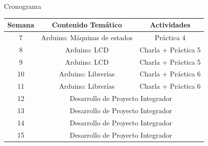 \documentclass[handout,xcolor=dvipsnames]{beamer}
\begin{document}
\begin{frame}{Cronograma}
 \begin{center}
 {\small
  \begin{tabular}{|c|c|c|}\hline

   Semana 	& \multicolumn{1}{c|}{Contenido Temático} & \multicolumn{1}{c|}{Actividades} \\ \hline \hline
   7 		& Arduino: Máquinas de estados	 & Práctica 4 \\ \hline
   8 		& Arduino: LCD  	             & Charla + Práctica 5 \\ \hline
   9 		& Arduino: LCD      		     & Charla + Práctica 5 \\ \hline
   10 		& Arduino: Librerías		& Charla + Práctica 6  \\ \hline
   11		& Arduino: Librerías	& Charla + Práctica 6  \\ \hline
   12 		& \multicolumn{2}{c|}{Desarrollo de Proyecto Integrador}  \\ \hline
   13 		& \multicolumn{2}{c|}{Desarrollo de Proyecto Integrador}  \\ \hline
   14		& \multicolumn{2}{c|}{Desarrollo de Proyecto Integrador}  \\ \hline
   15 		& \multicolumn{2}{c|}{Desarrollo de Proyecto Integrador}  \\ \hline
  \end{tabular}}
 \end{center}
\end{frame}
\end{document}
